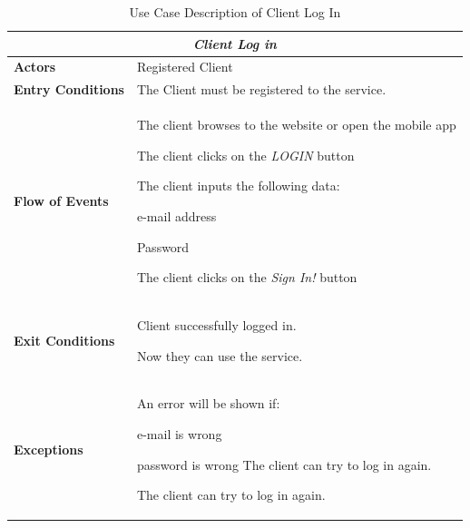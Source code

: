 \documentclass[a4paper]{article}
\begin{document}
\begin{table} [H]
\begin{center}
\begin{tabular}{ |m{}|m{}|  }
\hline
    \multicolumn{2}{|c|}{\textbf{\textit{Client Log in}}} \\
\hline \hline
    \textbf{Actors}
&   Registered Client
\\ \hline
    \textbf{Entry Conditions}
&   The Client must be registered to the service.
\\ \hline
    \textbf{Flow of Events}
& 
    \begin{enumerate*}
    \item The client browses to the website or open the mobile app
    \item The client clicks on the \emph{LOGIN} button
    \item The client inputs the following data:
        \begin{enumerate*}
        \item e-mail address
        \item Password
        \end{enumerate*}
    \item The client clicks on the \emph{Sign In!} button
    \end{enumerate*}
\\ \hline
    \textbf{Exit Conditions}
&   Client successfully logged in. 

    Now they can use the service.
\\ \hline
    \textbf{Exceptions}
&   
    An error will be shown if:
    \begin{itemize*}
    \item e-mail is wrong
    \item password is wrong
    The client can try to log in again.
    \end{itemize*}
    The client can try to log in again.
\\ \hline
\end{tabular}
\end{center}
\caption{Use Case Description of Client Log In}
\label{table:clientlogin}
\end{table}
\end{document}
